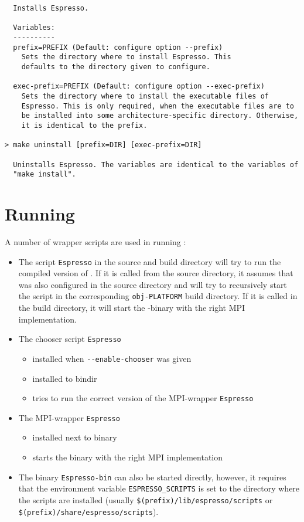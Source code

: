 \begin{verbatim}
  Installs Espresso.

  Variables:
  ----------
  prefix=PREFIX (Default: configure option --prefix)
    Sets the directory where to install Espresso. This
    defaults to the directory given to configure.

  exec-prefix=PREFIX (Default: configure option --exec-prefix)
    Sets the directory where to install the executable files of
    Espresso. This is only required, when the executable files are to
    be installed into some architecture-specific directory. Otherwise,
    it is identical to the prefix.

> make uninstall [prefix=DIR] [exec-prefix=DIR]

  Uninstalls Espresso. The variables are identical to the variables of
  "make install".
\end{verbatim}

\section{Running \es}
\label{sec:run}

A number of wrapper scripts are used in running \es{}:
\begin{itemize}
\item The script \texttt{Espresso} in the source and build directory
  will try to run the compiled version of \es. If it is called from
  the source directory, it assumes that \es{} was also configured in
  the source directory and will try to recursively start the script in
  the corresponding \texttt{obj-PLATFORM} build directory. If it is
  called in the build directory, it will start the \es-binary with the
  right MPI implementation.
\item The chooser script \texttt{Espresso} 
  \begin{itemize}
  \item installed when \verb!--enable-chooser! was given
  \item installed to bindir
  \item tries to run the correct version of the MPI-wrapper
    \texttt{Espresso}
  \end{itemize}
\item The MPI-wrapper \texttt{Espresso}
  \begin{itemize}
  \item installed next to \es{} binary
  \item starts the binary with the right MPI implementation
  \end{itemize}
\item The \es{} binary \texttt{Espresso-bin} can also be started
  directly, however, it requires that the environment variable
  \verb!ESPRESSO_SCRIPTS! is set to the directory where the scripts
  are installed (usually \verb!$(prefix)/lib/espresso/scripts! or
  \verb!$(prefix)/share/espresso/scripts!).
\end{itemize}



